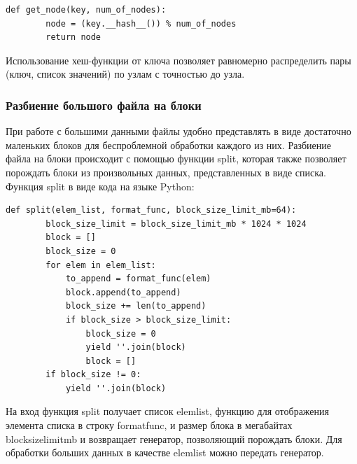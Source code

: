 \documentclass[12pt,a4paper,oneside]{extarticle}
\begin{document}
            \lstset{language=Python}
            \begin{lstlisting}[mathescape] 
    def get_node(key, num_of_nodes):
        node = (key.__hash__()) % num_of_nodes
        return node
            \end{lstlisting}

            Использование хеш-функции от ключа позволяет равномерно распределить пары (ключ, список значений) по узлам с точностью до узла.

        \subsubsection{Разбиение большого файла на блоки}
            При работе с большими данными файлы удобно представлять в виде достаточно маленьких блоков для беспроблемной обработки каждого из них.
            Разбиение файла на блоки происходит с помощью функции split, которая также позволяет порождать блоки из произвольных данных, представленных в виде списка. Функция split в виде кода на языке Python:

            \lstset{language=Python}
            \begin{lstlisting}[mathescape]
    def split(elem_list, format_func, block_size_limit_mb=64):
        block_size_limit = block_size_limit_mb * 1024 * 1024
        block = []
        block_size = 0
        for elem in elem_list:
            to_append = format_func(elem)       
            block.append(to_append)
            block_size += len(to_append)
            if block_size > block_size_limit:            
                block_size = 0
                yield ''.join(block)
                block = []
        if block_size != 0:
            yield ''.join(block)
            \end{lstlisting}

            На вход функция split получает список elem\textunderscore list, функцию для отображения элемента списка в строку format\textunderscore func, и размер блока в мегабайтах block\textunderscore size\textunderscore limit\textunderscore mb и возвращает генератор, позволяющий порождать блоки. Для обработки больших данных в качестве elem\textunderscore list можно передать генератор.        
\end{document}
